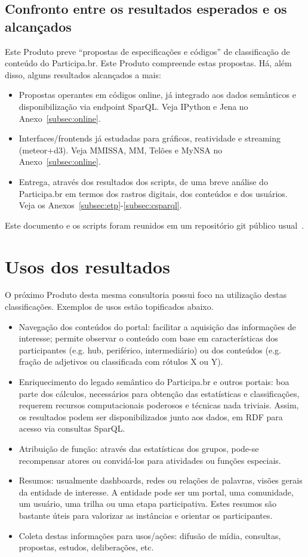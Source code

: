 \documentclass[12pt]{article}
\begin{document}
\subsection{Confronto entre os resultados esperados e os alcançados}
Este Produto preve “propostas de especificações e códigos” de classificação de conteúdo do Participa.br. Este Produto compreende estas propostas. Há, além disso, alguns resultados alcançados a mais:
\begin{itemize}
    \item Propostas operantes em códigos online, já integrado aos dados semânticos e disponibilização via endpoint SparQL. Veja IPython e Jena no Anexo~\ref{subsec:online}.
    \item Interfaces/frontends já estudadas para gráficos, reatividade e streaming (meteor+d3). Veja MMISSA, MM, Telões e MyNSA no Anexo~\ref{subsec:online}.
    \item Entrega, através dos resultados dos scripts, de uma breve análise do Participa.br em termos dos rastros digitais, dos conteúdos e dos usuários. Veja os Anexos~\ref{subsec:etp}-\ref{subsec:csparql}.
\end{itemize}

Este documento e os scripts foram reunidos em um repositório git público usual~\cite{repoProd3}.

\section{Usos dos resultados}
O próximo Produto desta mesma consultoria possui foco na utilização destas classificações. Exemplos de usos estão topificados abaixo.
\begin{itemize}
    \item Navegação dos conteúdos do portal: facilitar a aquisição das informações de interesse; permite observar o conteúdo com base em características dos participantes (e.g. hub, periférico, intermediário) ou dos conteúdos (e.g. fração de adjetivos ou classificada com rótulos X ou Y).
    \item Enriquecimento do legado semântico do Participa.br e outros portais: boa parte dos cálculos, necessários para obtenção das estatísticas e classificações, requerem recursos computacionais poderosos e técnicas nada triviais. Assim, os resultados podem ser disponibilizados junto aos dados, em RDF para acesso via consultas SparQL.
    \item Atribuição de função: através das estatísticas dos grupos, pode-se recompensar atores  ou convidá-los para atividades ou funções especiais.
    \item Resumos: usualmente dashboards, redes ou relações de palavras, visões gerais da entidade de interesse. A entidade pode ser um portal, uma comunidade, um usuário, uma trilha ou uma etapa participativa. Estes resumos são bastante úteis para valorizar as instâncias e orientar os participantes.
    \item Coleta destas informações para usos/ações: difusão de mídia, consultas, propostas, estudos, deliberações, etc.
\end{itemize}
\end{document}
